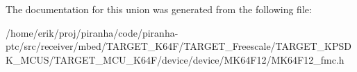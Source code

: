 The documentation for this union was generated from the following file\+:\begin{DoxyCompactItemize}
\item 
/home/erik/proj/piranha/code/piranha-\/ptc/src/receiver/mbed/\+T\+A\+R\+G\+E\+T\+\_\+\+K64\+F/\+T\+A\+R\+G\+E\+T\+\_\+\+Freescale/\+T\+A\+R\+G\+E\+T\+\_\+\+K\+P\+S\+D\+K\+\_\+\+M\+C\+U\+S/\+T\+A\+R\+G\+E\+T\+\_\+\+M\+C\+U\+\_\+\+K64\+F/device/device/\+M\+K64\+F12/M\+K64\+F12\+\_\+fmc.\+h\end{DoxyCompactItemize}

